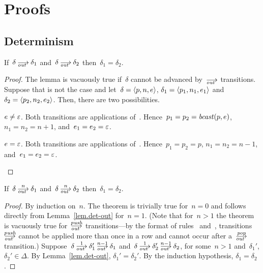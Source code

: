 \appendix
\section{Proofs}
\label{sec.proofs}

\subsection*{Determinism}


\begin{lemma}\label{lem.det-out}
  If~$\delta\out\delta_1$ and~$\delta\out\delta_2$ then~$\delta_1=\delta_2$.
\end{lemma}
\begin{proof}
  The lemma is vacuously true if~$\delta$ cannot be advanced by~$\out$
  transitions.  Suppose that is not the case and let~$\delta=\<p,n,e>$,
  $\delta_1=\<p_1,n_1,e_1>$ and~$\delta_2=\<p_2,n_2,e_2>$.  Then, there are
  two possibilities.
  \begin{case}
    $e\ne\varepsilon$.  Both transitions are applications of~.
    Hence~$p_1=p_2=\operatorname{\mathit{bcast}}(p,e)$, $n_1=n_2=n+1$, and~$e_1=e_2=\varepsilon$.
  \end{case}
  \begin{case}
    $e=\varepsilon$.  Both transitions are applications of~.
    Hence~$p_1=p_2=p$, $n_1=n_2=n-1$, and~$e_1=e_2=\varepsilon$.\qedhere
  \end{case}
\end{proof}


\begin{theorem}\label{thm.det-out-pop-n}
  If~$\delta\out[n]\delta_1$ and~$\delta\out[n]\delta_2$
  then~$\delta_1=\delta_2$.
\end{theorem}
\begin{proof}
  By induction on~$n$.
  The theorem is trivially true for~$n=0$ and follows directly from
  Lemma~\ref{lem.det-out} for~$n=1$.  (Note that for~$n>1$ the theorem is
  vacuously true for~$\outpush$ transitions---by the format of
  rules~ and~, transitions~$\outpush$ cannot be applied more
  than once in a row and cannot occur after a~$\outpop$ transition.)
  Suppose~$\delta\out[1]\delta_1'\out[n-1]\delta_1$
  and~$\delta\out[1]\delta_2'\out[n-1]\delta_2$, for some~$n>1$
  and~$\delta_1'$, $\delta_2'\in\Delta$.
  By Lemma~\ref{lem.det-out}, $\delta_1'=\delta_2'$.  By the induction
  hypothesis, $\delta_1=\delta_2$.\qedhere
\end{proof}

